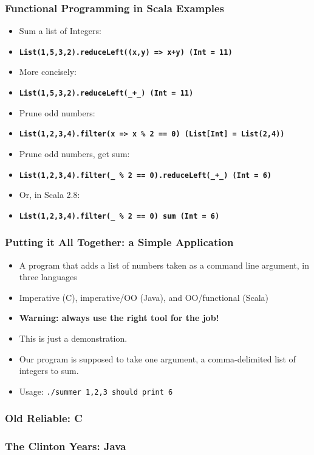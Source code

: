 \documentclass[hyperref={colorlinks=true}]{beamer}
\begin{document}
\begin{frame} 
\frametitle{Functional Programming in Scala Examples}
\begin{itemize}
  \item<1-> Sum a list of Integers:
  \item<1-> \tt\small\textbf{List(1,5,3,2).reduceLeft((x,y) => x+y) (Int = 11)}
  \item<2-> More concisely:
  \item<2-> \tt\small\textbf{List(1,5,3,2).reduceLeft(\_+\_) (Int = 11)}
  \item<3-> Prune odd numbers:
  \item<3-> \tt\small\textbf{List(1,2,3,4).filter(x => x \% 2 == 0) (List[Int] = List(2,4))}
  \item<4-> Prune odd numbers, get sum:
  \item<4-> \tt\small\textbf{List(1,2,3,4).filter(\_ \% 2 == 0).reduceLeft(\_+\_) (Int = 6)}
  \item<5-> Or, in Scala 2.8:
  \item<5-> \tt\small\textbf{List(1,2,3,4).filter(\_ \% 2 == 0) sum (Int = 6)}
\end{itemize}
\end{frame} 

\begin{frame} 
\frametitle{Putting it All Together: a Simple Application}
\begin{itemize}
  \item<1-> A program that adds a list of numbers taken as a command line argument, in three languages 
  \item<2-> Imperative (C), imperative/OO (Java), and OO/functional (Scala)
  \item<3-> \textbf{Warning: always use the right tool for the job!}
  \item<3-> This is just a demonstration.
  \item<4-> Our program is supposed to take one argument, a comma-delimited list of integers to sum.
  \item<4-> Usage: \tt{./summer 1,2,3} should print 6
\end{itemize}
\end{frame} 

\begin{frame} 
\frametitle{Old Reliable: C}
\tt\tiny{

}
\end{frame} 

\begin{frame} 
\frametitle{The Clinton Years: Java}
\tt\tiny{

}
\end{frame} 
\end{document}
